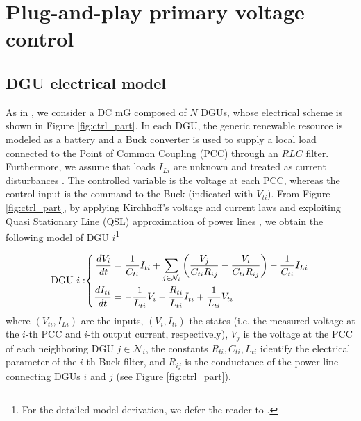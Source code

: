 \documentclass[a4paper]{article}
\theoremstyle{plain}
\begin{document}
\section{Plug-and-play primary voltage control}
\label{sec:PnP_primary}

\subsection{DGU electrical model}
\label{sec:mG_model}
As in \cite{tucci2015decentralized}, we consider a DC mG composed of
$N$ DGUs, whose electrical scheme is shown
in Figure \ref{fig:ctrl_part}. In each DGU, the generic renewable
resource is modeled as a battery and a Buck converter is
used to supply a local load connected to the Point of Common Coupling
(PCC) through an $RLC$ filter. 
Furthermore, we assume
that loads $I_{Li}$ are unknown and treated as current disturbances
\cite{tucci2015decentralized,tucci2016improved}. The controlled variable is the voltage at
each PCC, whereas the control input is the command to the Buck (indicated with $V_{ti}$). From Figure \ref{fig:ctrl_part}, by applying Kirchhoff's
voltage and current laws and exploiting Quasi Stationary Line (QSL)
approximation of power lines \cite{tucci2015decentralized,tucci2016improved}, we obtain
the following model of DGU $i$\footnote{For the detailed model
	derivation, we defer the reader to \cite{tucci2015decentralized}.}

\begin{equation*}
\label{eq:newDGU}
\text{DGU}~i:\hspace{-4.5mm}\quad\left\lbrace
\begin{aligned}
\frac{dV_{i}}{dt} &= \frac{1}{C_{ti}}I_{ti}+\sum\limits_{j\in\mathcal{N}_i}\left(\frac{V_j}{C_{ti} R_{ij}}-\frac{V_i}{C_{ti}R_{ij}}\right)-\frac{1}{C_{ti}}I_{Li}\\
\frac{dI_{ti}}{dt} &= -\frac{1}{L_{ti}}V_{i}-\frac{R_{ti}}{L_{ti}}I_{ti}+\frac{1}{L_{ti}}V_{ti}\\
\end{aligned}
\right.
\end{equation*}
where $(V_{ti},I_{Li})$ are the inputs, $(V_{i},I_{ti})$ the states (i.e. the measured voltage at the $i$-th PCC and $i$-th output current, respectively), $V_{j}$ is the voltage at the PCC of each neighboring DGU $j\in\mathcal{N}_i$, the constants $R_{ti},C_{ti},L_{ti}$ identify the electrical parameter of the $i$-th Buck filter, and $R_{ij}$ is the conductance of the power line connecting DGUs $i$ and $j$ (see Figure \ref{fig:ctrl_part}).
\end{document}
